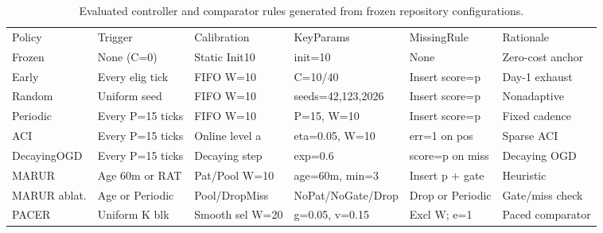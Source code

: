\begin{table}[!ht]
\centering\footnotesize\setlength{\tabcolsep}{3.5pt}
\caption{Evaluated controller and comparator rules generated from frozen repository configurations.}
\begin{tabular}{llllll}
\hline
Policy & Trigger & Calibration & KeyParams & MissingRule & Rationale \\
Frozen & None (C=0) & Static Init10 & init=10 & None & Zero-cost anchor \\
Early & Every elig tick & FIFO W=10 & C=10/40 & Insert score=p & Day-1 exhaust \\
Random & Uniform seed & FIFO W=10 & seeds=42,123,2026 & Insert score=p & Nonadaptive \\
Periodic & Every P=15 ticks & FIFO W=10 & P=15, W=10 & Insert score=p & Fixed cadence \\
ACI & Every P=15 ticks & Online level a & eta=0.05, W=10 & err=1 on pos & Sparse ACI \\
DecayingOGD & Every P=15 ticks & Decaying step & exp=0.6 & score=p on miss & Decaying OGD \\
MARUR & Age 60m or RAT & Pat/Pool W=10 & age=60m, min=3 & Insert p + gate & Heuristic \\
MARUR ablat. & Age or Periodic & Pool/DropMiss & NoPat/NoGate/Drop & Drop or Periodic & Gate/miss check \\
PACER & Uniform K blk & Smooth sel W=20 & g=0.05, v=0.15 & Excl W; e=1 & Paced comparator \\
\hline
\end{tabular}
\end{table}
